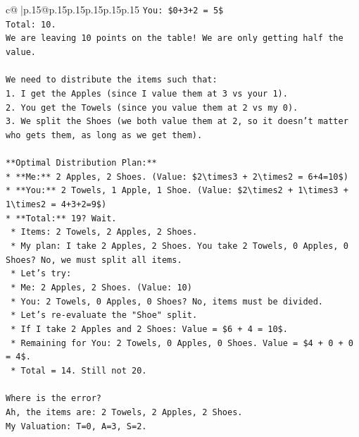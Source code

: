 \documentclass{article}
\begin{document}
{\begin{supertabular}{c@{$\;$}|p{.15\linewidth}@{}p{.15\linewidth}p{.15\linewidth}p{.15\linewidth}p{.15\linewidth}p{.15\linewidth}}
{{{\texttt{You: \$0+3+2 = 5\$} \\
\texttt{Total: 10.} \\
\texttt{We are leaving 10 points on the table! We are only getting half the value.} \\
\\ 
\texttt{We need to distribute the items such that:} \\
\texttt{1.  I get the Apples (since I value them at 3 vs your 1).} \\
\texttt{2.  You get the Towels (since you value them at 2 vs my 0).} \\
\texttt{3.  We split the Shoes (we both value them at 2, so it doesn't matter who gets them, as long as we get them).} \\
\\ 
\texttt{**Optimal Distribution Plan:**} \\
\texttt{*   **Me:** 2 Apples, 2 Shoes. (Value: \$2\textbackslash{}times3 + 2\textbackslash{}times2 = 6+4=10\$)} \\
\texttt{*   **You:** 2 Towels, 1 Apple, 1 Shoe. (Value: \$2\textbackslash{}times2 + 1\textbackslash{}times3 + 1\textbackslash{}times2 = 4+3+2=9\$)} \\
\texttt{*   **Total:** 19? Wait.} \\
\texttt{    *   Items: 2 Towels, 2 Apples, 2 Shoes.} \\
\texttt{    *   My plan: I take 2 Apples, 2 Shoes. You take 2 Towels, 0 Apples, 0 Shoes? No, we must split all items.} \\
\texttt{    *   Let's try:} \\
\texttt{        *   Me: 2 Apples, 2 Shoes. (Value: 10)} \\
\texttt{        *   You: 2 Towels, 0 Apples, 0 Shoes? No, items must be divided.} \\
\texttt{        *   Let's re{-}evaluate the "Shoe" split.} \\
\texttt{        *   If I take 2 Apples and 2 Shoes: Value = \$6 + 4 = 10\$.} \\
\texttt{        *   Remaining for You: 2 Towels, 0 Apples, 0 Shoes. Value = \$4 + 0 + 0 = 4\$.} \\
\texttt{        *   Total = 14. Still not 20.} \\
\\ 
\texttt{Where is the error?} \\
\texttt{Ah, the items are: 2 Towels, 2 Apples, 2 Shoes.} \\
\texttt{My Valuation: T=0, A=3, S=2.} \\
}}}
\end{supertabular}}
\end{document}
